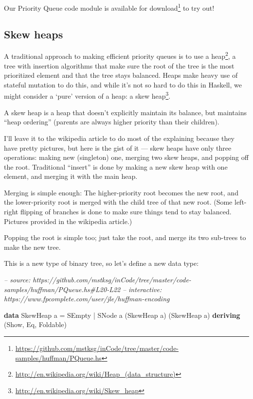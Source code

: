 \documentclass[]{article}
\newenvironment{Shaded}{}{}
\newcommand{\CommentTok}[1]{\textcolor[rgb]{0.38,0.63,0.69}{\textit{#1}}}
\newcommand{\DataTypeTok}[1]{\textcolor[rgb]{0.56,0.13,0.00}{#1}}
\newcommand{\FunctionTok}[1]{\textcolor[rgb]{0.02,0.16,0.49}{#1}}
\newcommand{\KeywordTok}[1]{\textcolor[rgb]{0.00,0.44,0.13}{\textbf{#1}}}
\newcommand{\NormalTok}[1]{#1}
\renewcommand{\href}[2]{#2\footnote{\url{#1}}}
\begin{document}
Our Priority Queue code module is
\href{https://github.com/mstksg/inCode/tree/master/code-samples/huffman/PQueue.hs}{available
for download} to try out!

\hypertarget{skew-heaps}{%
\subsection{Skew heaps}\label{skew-heaps}}

A traditional approach to making efficient priority queues is to use a
\href{http://en.wikipedia.org/wiki/Heap_(data_structure)}{heap}, a tree with
insertion algorithms that make sure the root of the tree is the most prioritized
element and that the tree stays balanced. Heaps make heavy use of stateful
mutation to do this, and while it's not so hard to do this in Haskell, we might
consider a `pure' version of a heap: a
\href{http://en.wikipedia.org/wiki/Skew_heap}{skew heap}.

A skew heap is a heap that doesn't explicitly maintain its balance, but
maintains ``heap ordering'' (parents are always higher priority than their
children).

I'll leave it to the wikipedia article to do most of the explaining because they
have pretty pictures, but here is the gist of it --- skew heaps have only three
operations: making new (singleton) one, merging two skew heaps, and popping off
the root. Traditional ``insert'' is done by making a new skew heap with one
element, and merging it with the main heap.

Merging is simple enough: The higher-priority root becomes the new root, and the
lower-priority root is merged with the child tree of that new root. (Some
left-right flipping of branches is done to make sure things tend to stay
balanced. Pictures provided in the wikipedia article.)

Popping the root is simple too; just take the root, and merge its two sub-trees
to make the new tree.

This is a new type of binary tree, so let's define a new data type:

\begin{Shaded}
\begin{Highlighting}[]
\CommentTok{-- source: https://github.com/mstksg/inCode/tree/master/code-samples/huffman/PQueue.hs#L20-L22}
\CommentTok{-- interactive: https://www.fpcomplete.com/user/jle/huffman-encoding}

\KeywordTok{data} \DataTypeTok{SkewHeap}\NormalTok{ a }\FunctionTok{=} \DataTypeTok{SEmpty}
                \FunctionTok{|} \DataTypeTok{SNode}\NormalTok{ a (}\DataTypeTok{SkewHeap}\NormalTok{ a) (}\DataTypeTok{SkewHeap}\NormalTok{ a)}
                \KeywordTok{deriving}\NormalTok{ (}\DataTypeTok{Show}\NormalTok{, }\DataTypeTok{Eq}\NormalTok{, }\DataTypeTok{Foldable}\NormalTok{)}
\end{Highlighting}
\end{Shaded}
\end{document}
